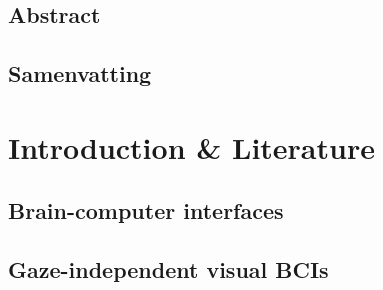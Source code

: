 %
\usepackage{todonotes}
\usepackage{hyperref}
\usepackage{tabularx}
\usepackage{booktabs}
\usepackage[inline]{enumitem}
\usepackage{subcaption}
\usepackage{algorithm}
\usepackage{algpseudocode}



\newcommand{\includechapter}[2]{
  \chapter{#1}
  \begin{refsection}
  
    \printbibliography[heading=subbibliography]
  \end{refsection}
  \clearpage
}

\newcommand{\comment}[1]{
  \todo[color=yellow]{#1}
}
\newcommand*\elide{\textup{[\,\dots]}}

\usepackage[backend=biber, doi=false, url=false, isbn=false, eprint=false]{biblatex}



\renewcommand*{\bibfont}{\footnotesize}


\usepackage[inline]{enumitem}



\frontmatter


\chapter{Abstract}

\chapter{Samenvatting}
\tableofcontents
\listoffigures
\listoftables
\printacronyms[name=List of acronyms]

\mainmatter%

\part{Introduction \& Literature}
\includechapter{Brain-computer interfaces}{chapters/bci.tex}
\includechapter{Gaze-independent visual BCIs}{chapters/gaze_independence.tex}

